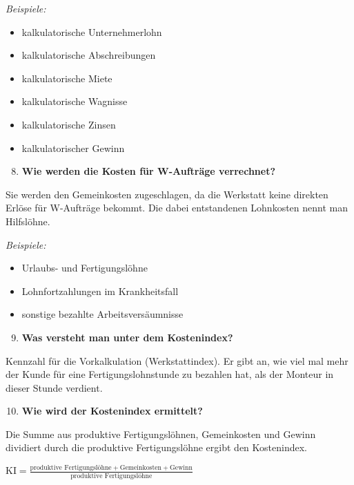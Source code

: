 \emph{Beispiele:}

\begin{itemize}
\item
  kalkulatorische Unternehmerlohn
\item
  kalkulatorische Abschreibungen
\item
  kalkulatorische Miete
\item
  kalkulatorische Wagnisse
\item
  kalkulatorische Zinsen
\item
  kalkulatorischer Gewinn
\end{itemize}

\begin{enumerate}
\setcounter{enumi}{7}
\item
  \textbf{Wie werden die Kosten für W-Aufträge verrechnet?}
\end{enumerate}

Sie werden den Gemeinkosten zugeschlagen, da die Werkstatt keine
direkten Erlöse für W-Aufträge bekommt. Die dabei entstandenen
Lohnkosten nennt man Hilfslöhne.

\emph{Beispiele:}

\begin{itemize}
\item
  Urlaubs- und Fertigungslöhne
\item
  Lohnfortzahlungen im Krankheitsfall
\item
  sonstige bezahlte Arbeitsversäumnisse
\end{itemize}

\begin{enumerate}
\setcounter{enumi}{8}
\item
  \textbf{Was versteht man unter dem Kostenindex?}
\end{enumerate}

Kennzahl für die Vorkalkulation (Werkstattindex). Er gibt an, wie viel
mal mehr der Kunde für eine Fertigungslohnstunde zu bezahlen hat, als
der Monteur in dieser Stunde verdient.

\begin{enumerate}
\setcounter{enumi}{9}
\item
  \textbf{Wie wird der Kostenindex ermittelt?}
\end{enumerate}

Die Summe aus produktive Fertigungslöhnen, Gemeinkosten und Gewinn
dividiert durch die produktive Fertigungslöhne ergibt den Kostenindex.

$\boxed{\text{KI} = \frac{\text{produktive Fertigungslöhne} + \text{Gemeinkosten} + \text{Gewinn}}{\text{produktive Fertigungslöhne}}}$


